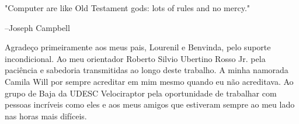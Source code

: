 
\bacharelado {}
\data {\today}





\newpage
\pagestyle{empty}

\maketitle
 \begin{epigrafe}
\noindent "Computer are like Old Testament gods: lots of rules and no mercy."

--Joseph Campbell
\end{epigrafe}

Agradeço primeiramente aos meus pais, Lourenil e Benvinda, pelo suporte incondicional. Ao meu orientador Roberto Silvio Ubertino Rosso Jr. pela paciência e sabedoria transmitidas ao longo deste trabalho. A minha namorada Camila Will por sempre acreditar em mim mesmo quando eu não acreditava. Ao grupo de Baja da UDESC Velociraptor pela oportunidade de trabalhar com pessoas incríveis como eles e aos meus amigos que estiveram sempre ao meu lado nas horas mais difíceis.   